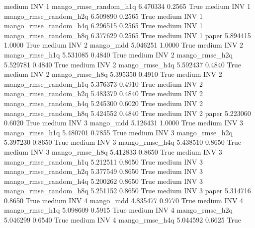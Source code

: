     medium      INV                 1 mango_rmse_random_h1q   6.470334      0.2565    True
    medium      INV                 1 mango_rmse_random_h2q   6.509890      0.2565    True
    medium      INV                 1 mango_rmse_random_h4q   6.296515      0.2565    True
    medium      INV                 1 mango_rmse_random_h8q   6.377629      0.2565    True
    medium      INV                 1                 paper   5.894415      1.0000    True
    medium      INV                 2             mango_mdd   5.046251      1.0000    True
    medium      INV                 2        mango_rmse_h1q   5.531085      0.4840    True
    medium      INV                 2        mango_rmse_h2q   5.529781      0.4840    True
    medium      INV                 2        mango_rmse_h4q   5.592437      0.4840    True
    medium      INV                 2        mango_rmse_h8q   5.395350      0.4910    True
    medium      INV                 2 mango_rmse_random_h1q   5.376373      0.4910    True
    medium      INV                 2 mango_rmse_random_h2q   5.483379      0.4840    True
    medium      INV                 2 mango_rmse_random_h4q   5.245300      0.6020    True
    medium      INV                 2 mango_rmse_random_h8q   5.424552      0.4840    True
    medium      INV                 2                 paper   5.223060      0.6020    True
    medium      INV                 3             mango_mdd   5.126431      1.0000    True
    medium      INV                 3        mango_rmse_h1q   5.480701      0.7855    True
    medium      INV                 3        mango_rmse_h2q   5.397230      0.8650    True
    medium      INV                 3        mango_rmse_h4q   5.438510      0.8650    True
    medium      INV                 3        mango_rmse_h8q   5.412833      0.8650    True
    medium      INV                 3 mango_rmse_random_h1q   5.212511      0.8650    True
    medium      INV                 3 mango_rmse_random_h2q   5.377549      0.8650    True
    medium      INV                 3 mango_rmse_random_h4q   5.200262      0.8650    True
    medium      INV                 3 mango_rmse_random_h8q   5.251152      0.8650    True
    medium      INV                 3                 paper   5.314716      0.8650    True
    medium      INV                 4             mango_mdd   4.835477      0.9770    True
    medium      INV                 4        mango_rmse_h1q   5.098609      0.5915    True
    medium      INV                 4        mango_rmse_h2q   5.046299      0.6540    True
    medium      INV                 4        mango_rmse_h4q   5.044592      0.6625    True

